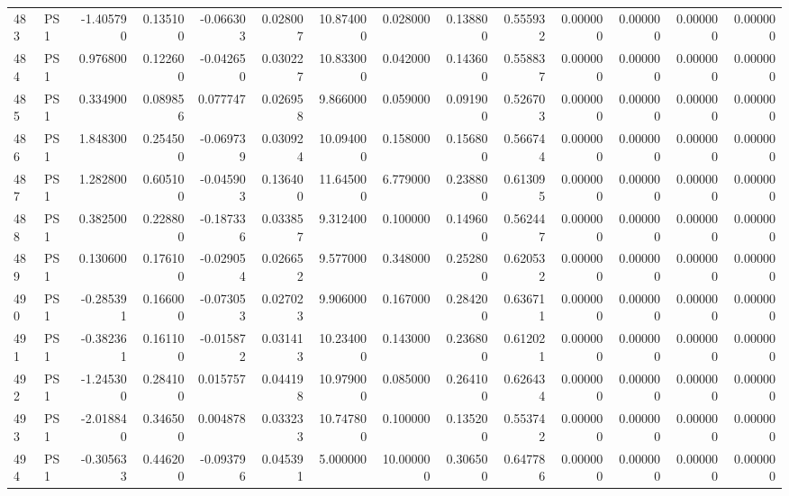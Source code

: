 \begin{tabular}{llrrrrrrrrrrrr}
483 &    PS1 & -1.405790 &      0.135100 & -0.066303 &    0.028007 &  10.874000 &      0.028000 &   0.138800 &  0.555932 &  0.000000 &   0.000000 &     0.000000 &     0.000000 \\
484 &    PS1 &  0.976800 &      0.122600 & -0.042650 &    0.030227 &  10.833000 &      0.042000 &   0.143600 &  0.558837 &  0.000000 &   0.000000 &     0.000000 &     0.000000 \\
485 &    PS1 &  0.334900 &      0.089856 &  0.077747 &    0.026958 &   9.866000 &      0.059000 &   0.091900 &  0.526703 &  0.000000 &   0.000000 &     0.000000 &     0.000000 \\
486 &    PS1 &  1.848300 &      0.254500 & -0.069739 &    0.030924 &  10.094000 &      0.158000 &   0.156800 &  0.566744 &  0.000000 &   0.000000 &     0.000000 &     0.000000 \\
487 &    PS1 &  1.282800 &      0.605100 & -0.045903 &    0.136400 &  11.645000 &      6.779000 &   0.238800 &  0.613095 &  0.000000 &   0.000000 &     0.000000 &     0.000000 \\
488 &    PS1 &  0.382500 &      0.228800 & -0.187336 &    0.033857 &   9.312400 &      0.100000 &   0.149600 &  0.562447 &  0.000000 &   0.000000 &     0.000000 &     0.000000 \\
489 &    PS1 &  0.130600 &      0.176100 & -0.029054 &    0.026652 &   9.577000 &      0.348000 &   0.252800 &  0.620532 &  0.000000 &   0.000000 &     0.000000 &     0.000000 \\
490 &    PS1 & -0.285391 &      0.166000 & -0.073053 &    0.027023 &   9.906000 &      0.167000 &   0.284200 &  0.636711 &  0.000000 &   0.000000 &     0.000000 &     0.000000 \\
491 &    PS1 & -0.382361 &      0.161100 & -0.015872 &    0.031413 &  10.234000 &      0.143000 &   0.236800 &  0.612021 &  0.000000 &   0.000000 &     0.000000 &     0.000000 \\
492 &    PS1 & -1.245300 &      0.284100 &  0.015757 &    0.044198 &  10.979000 &      0.085000 &   0.264100 &  0.626434 &  0.000000 &   0.000000 &     0.000000 &     0.000000 \\
493 &    PS1 & -2.018840 &      0.346500 &  0.004878 &    0.033233 &  10.747800 &      0.100000 &   0.135200 &  0.553742 &  0.000000 &   0.000000 &     0.000000 &     0.000000 \\
494 &    PS1 & -0.305633 &      0.446200 & -0.093796 &    0.045391 &   5.000000 &     10.000000 &   0.306500 &  0.647786 &  0.000000 &   0.000000 &     0.000000 &     0.000000 \\

\end{tabular}
